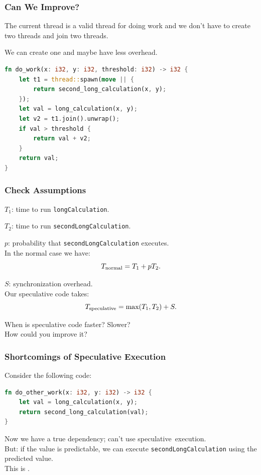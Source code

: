\begin{frame}[fragile]
\frametitle{Can We Improve?}

The current thread is a valid thread for doing work and we don't have to create two threads and join two threads. 

We can create one and maybe have less overhead.

\begin{lstlisting}[language=Rust]
fn do_work(x: i32, y: i32, threshold: i32) -> i32 {
    let t1 = thread::spawn(move || {
        return second_long_calculation(x, y);
    });
    let val = long_calculation(x, y);
    let v2 = t1.join().unwrap();
    if val > threshold {
        return val + v2;
    }
    return val;
}
\end{lstlisting}


\end{frame}

\begin{frame}
\frametitle{Check Assumptions}
  
  $T_1$: time to run {\tt longCalculation}.

  $T_2$: time to run {\tt secondLongCalculation}.

  $p$: probability that {\tt secondLongCalculation} executes.\\[1em]

  In the normal case we have:
    \[T_{\mbox{\scriptsize normal}} = T_1 + pT_2.\]

  $S$: synchronization overhead.\\
  Our speculative code takes:
    \[ T_{\mbox{\scriptsize speculative}} = \mbox{max}(T_1, T_2) + S.\]

     When is speculative code faster? Slower? \\ How could you improve it?

  
\end{frame}

\begin{frame}[fragile]
  \frametitle{Shortcomings of Speculative Execution}

  
  Consider the following code:
  
\begin{lstlisting}[language=Rust]
fn do_other_work(x: i32, y: i32) -> i32 {
    let val = long_calculation(x, y);
    return second_long_calculation(val);
}
\end{lstlisting}

  Now we have a true dependency; can't use speculative~execution.\\[1em]

  But: if the value is predictable, we can execute
      {\tt secondLongCalculation} using the predicted value.\\[1em]

  This is .
  
\end{frame}

